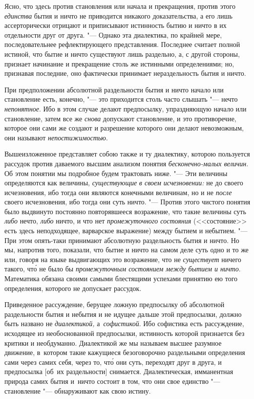 Ясно, что здесь против становления или начала и прекращения, против этого {\em
единства} бытия и ничто не приводится никакого доказательства, а его лишь
ассерторически отрицают и приписывают истинность бытию и ничто в их отдельности
друг от друга. "--- Однако эта диалектика, по крайней мере, последовательнее
рефлектирующего представления. Последнее считает полной истиной, что бытие и
ничто существуют лишь раздельно, а, с другой стороны, признает начинание и
прекращение столь же истинными определениями; но, признавая последние, оно
фактически принимает нераздельность бытия и ничто.

При предположении абсолютной раздельности бытия и ничто начало или становление
есть, конечно, "--- это приходится столь часто слышать "--- нечто
{\em непонятное}. Ибо в этом случае делают предпосылку, упраздняющую начало
или становление, затем все же {\em снова} допускают становление, и это
противоречие, которое они сами же создают и разрешение которого они делают
невозможным, они называют {\em непостижимостью}.

Вышеизложенное представляет собою также и ту диалектику, которою пользуется
рассудок против даваемого высшим анализом понятия {\em бесконечно-малых
величин}. Об этом понятии мы подробное будем трактовать ниже. "--- Эти величины
определяются как величины, {\em существующие} {\em в своем исчезновении:} не до
своего исчезновения, ибо тогда они являются конечными величинам, но и не
{\em после} своего исчезновения, ибо тогда они суть ничто. "--- Против этого
чистого понятия было выдвинуто постоянно повторявшееся возражение, что такие
величины суть {\em либо} нечто, {\em либо} ничто, и что нет {\em промежуточного
состояния} (<<состояние>> есть здесь неподходящее, варварское выражение) между
бытием и небытием. "--- При этом опять-таки принимают абсолютную раздельность
бытия и ничто. Но мы, напротив того, показали, что бытие и ничто на самом деле
суть одно и то же или, говоря на языке выдвигающих это возражение, что не
{\em существует} ничего такого, чт\'{о} не было бы {\em промежуточным
состоянием между бытием и ничто}. Математика обязана своими самыми блестящими
успехами принятию ею того определения, которого не допускает рассудок.

Приведенное рассуждение, берущее ложную предпосылку об абсолютной раздельности
бытия и небытия и не идущее дальше этой предпосылки, должно быть названо не
{\em диалектикой,} а~{\em софистикой}. Ибо софистика есть рассуждение,
исходящее из необоснованной предпосылки, истинность которой признается без
критики и необдуманно. Диалектикой же мы называем высшее разумное движение,
в~котором такие кажущиеся безоговорочно раздельными определения сами через
самих себя, через то, чт\'{о} они суть, переходят друг в друга, и предпосылка
[об~их раздельности] снимается. Диалектическая, имманентная природа самих бытия
и~ничто состоит в том, что они свое единство "--- становление "--- обнаруживают
как свою истину.

